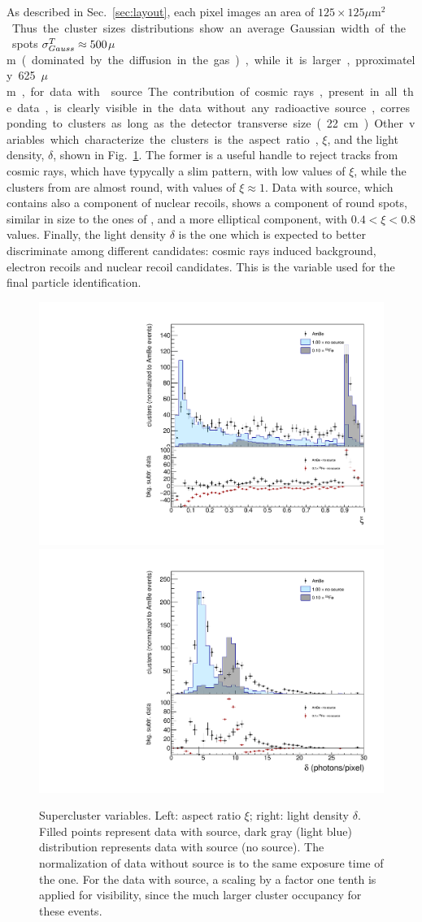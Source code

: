 As described in Sec.~\ref{sec:layout}, each pixel images an area of
$125\times125$\unit{$\mu$m$^2$}. Thus the cluster sizes distributions
show an average Gaussian width of the \fe spots
$\sigma^T_{Gauss}\approx500$\unit{$\mu$m} (dominated by the diffusion in the
gas), while it is larger, pproximately 625\unit{$\mu$m}, for data
with \ambe source.  The contribution of cosmic rays, present in all
the data, is clearly visible in the data without any radioactive
source, corresponding to clusters as long as the detector transverse
size (22\unit{cm}).

Other variables which characterize the clusters is the aspect ratio,
$\xi$, and the light density, $\delta$, shown in
Fig.~\ref{fig:clshape}. The former is a useful handle to reject tracks
from cosmic rays, which have typycally a slim pattern, with low values
of $\xi$, while the clusters from \fe are almost round, with values of
$\xi\approx1$. Data with \ambe source, which contains also a component
of nuclear recoils, shows a component of round spots, similar in size
to the ones of \fe, and a more elliptical component, with
$0.4<\xi<0.8$ values. Finally, the light density $\delta$ is the one
which is expected to better discriminate among different candidates:
cosmic rays induced background, electron recoils and nuclear recoil
candidates. This is the variable used for the final particle
identification.

\begin{figure}[ht]
  \begin{center}
  \includegraphics[width=0.45\linewidth]{figures/slimness}
  \includegraphics[width=0.45\linewidth]{figures/density}

  \caption{Supercluster variables. Left: aspect ratio $\xi$; right:
    light density $\delta$. Filled points represent data with \ambe
    source, dark gray (light blue) distribution represents data
    with \fe source (no source).  The normalization of data without
    source is to the same exposure time of the \ambe one. For the data
    with \fe source, a scaling by a factor one tenth is applied for
    visibility, since the much larger cluster occupancy for these
    events.  \label{fig:clshape}}

\end{center}
\end{figure}

